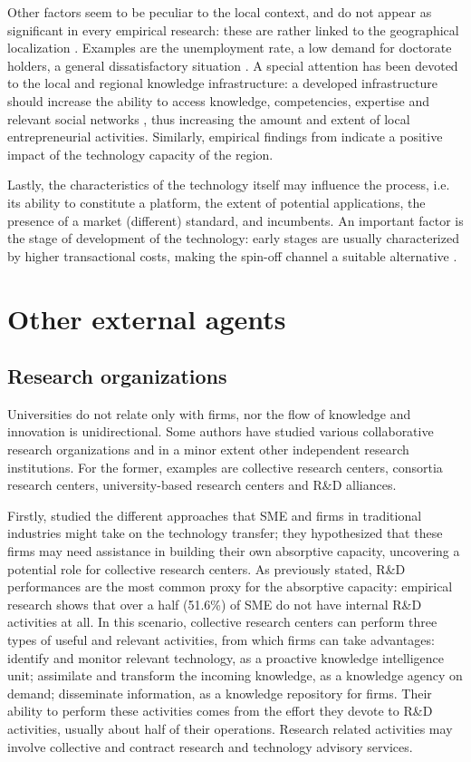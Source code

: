 Other factors seem to be peculiar to the local context, and do not appear as significant in every empirical research: these are rather linked to the geographical localization \citep{OShea2004}. Examples are the unemployment rate, a low demand for doctorate holders, a general dissatisfactory situation \citep{Rizzo2015}. A special attention has been devoted to the local and regional knowledge infrastructure: a developed infrastructure should increase the ability to access knowledge, competencies, expertise and relevant social networks \citep{OShea2004}, thus increasing the amount and extent of local entrepreneurial activities. Similarly, empirical findings from \citet{Audretsch2005} indicate a positive impact of the technology capacity of the region.

Lastly, the characteristics of the technology itself may influence the process, i.e. its ability to constitute a platform, the extent of potential applications, the presence of a market (different) standard, and incumbents. An important factor is the stage of development of the technology: early stages are usually characterized by higher transactional costs, making the spin-off channel a suitable alternative \citep{Rizzo2015}. 

\section{Other external agents}

\subsection{Research organizations}

Universities do not relate only with firms, nor the flow of knowledge and innovation is unidirectional. Some authors have studied various collaborative research organizations and in a minor extent other independent research institutions. For the former, examples are collective research centers, consortia research centers, university-based research centers and R\&D alliances. 

Firstly, \citet{Spithoven2011} studied the different approaches that SME and firms in traditional industries might take on the technology transfer; they hypothesized that these firms may need assistance in building their own absorptive capacity, uncovering a potential role for collective research centers. As previously stated, R\&D performances are the most common proxy for the absorptive capacity: empirical research shows that over a half (51.6\%) of SME do not have internal R\&D activities at all. In this scenario, collective research centers can perform three types of useful and relevant activities, from which firms can take advantages: identify and monitor relevant technology, as a proactive knowledge intelligence unit; assimilate and transform the incoming knowledge, as a knowledge agency on demand; disseminate information, as a knowledge repository for firms. Their ability to perform these activities comes from the effort they devote to R\&D activities, usually about half of their operations. Research related activities may involve collective and contract research and technology advisory services.

